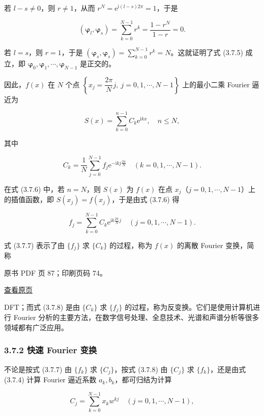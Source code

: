 若 \(l-s\ne0\)，则 \(r\ne1\)，从而 \(r^N=\mathrm e^{\mathrm i(l-s)2\pi}=1\)，于是

\[
(\boldsymbol\varphi_l,\boldsymbol\varphi_s)=\sum_{k=0}^{N-1}r^k=\frac{1-r^N}{1-r}=0.
\]

若 \(l=s\)，则 \(r=1\)，于是 \((\boldsymbol\varphi_s,\boldsymbol\varphi_s)=\sum_{k=0}^{N-1}r^k=N\)。这就证明了式 (3.7.5) 成立，即 \(\boldsymbol\varphi_0,\boldsymbol\varphi_1,\cdots,\boldsymbol\varphi_{N-1}\) 是正交的。

因此，\(f(x)\) 在 \(N\) 个点 \(\left\{x_j=\dfrac{2\pi}{N}j,\ j=0,1,\cdots,N-1\right\}\) 上的最小二乘 Fourier 逼近为

\[
S(x)=\sum_{k=0}^{n-1}C_k\mathrm e^{\mathrm ikx},\quad n\leqslant N,\tag{3.7.6}
\]

其中

\[
C_k=\frac1N\sum_{j=0}^{N-1}f_j\mathrm e^{-\mathrm ikj\frac{2\pi}{N}}\quad(k=0,1,\cdots,N-1).\tag{3.7.7}
\]

在式 (3.7.6) 中，若 \(n=N\)，则 \(S(x)\) 为 \(f(x)\) 在点 \(x_j\)（\(j=0,1,\cdots,N-1\)）上的插值函数，即 \(S(x_j)=f(x_j)\)，于是由式 (3.7.6) 得

\[
f_j=\sum_{k=0}^{N-1}C_k\mathrm e^{\mathrm ik\frac{2\pi}{N}j}\quad(j=0,1,\cdots,N-1).\tag{3.7.8}
\]

式 (3.7.7) 表示了由 \(\{f_j\}\) 求 \(\{C_k\}\) 的过程，称为 \(f(x)\) 的离散 Fourier 变换，简称

\clearpage

原书 PDF 页 87；印刷页码 74。

\href{source-images/pdf-087.jpeg}{查看原页}

DFT；而式 (3.7.8) 是由 \(\{C_k\}\) 求 \(\{f_j\}\) 的过程，称为反变换。它们是使用计算机进行 Fourier 分析的主要方法，在数字信号处理、全息技术、光谱和声谱分析等很多领域都有广泛应用。

\subsubsection{3.7.2 快速 Fourier 变换}\label{ch03b-ux5febux901f-fourier-ux53d8ux6362}

不论是按式 (3.7.7) 由 \(\{f_k\}\) 求 \(\{C_j\}\)，按式 (3.7.8) 由 \(\{C_j\}\) 求 \(\{f_k\}\)，还是由式 (3.7.4) 计算 Fourier 逼近系数 \(a_k,b_k\)，都可归结为计算

\[
C_j=\sum_{k=0}^{N-1}x_kw^{kj}\quad(j=0,1,\cdots,N-1),\tag{3.7.9}
\]

